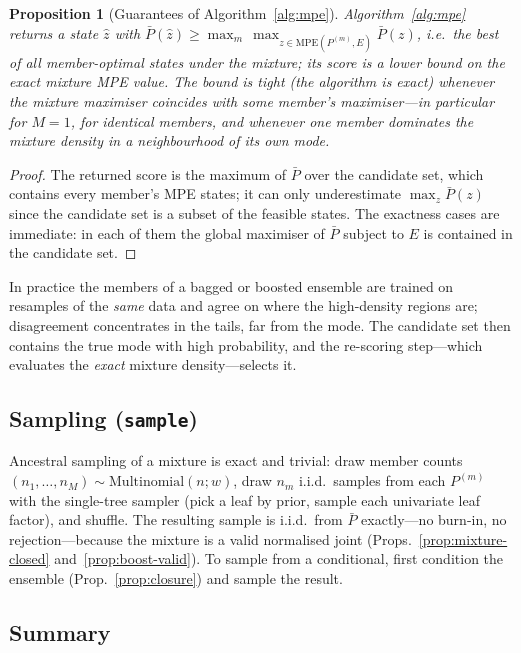 \documentclass[11pt]{article}
\theoremstyle{plain}
\newtheorem{proposition}[theorem]{Proposition}
\theoremstyle{definition}
\theoremstyle{remark}
\begin{document}
\begin{proposition}[Guarantees of Algorithm~\ref{alg:mpe}]
\label{prop:mpe}
Algorithm~\ref{alg:mpe} returns a state $\hat z$ with
$\bar P(\hat z)\ge \max_m\,\max_{z\in\text{MPE}(P^{(m)},E)}\bar P(z)$,
i.e.\ the best of all member-optimal states under the mixture; its score
is a lower bound on the exact mixture MPE value. The bound is tight
(the algorithm is exact) whenever the mixture maximiser coincides with
some member's maximiser---in particular for $M=1$, for identical
members, and whenever one member dominates the mixture density in a
neighbourhood of its own mode.
\end{proposition}
\begin{proof}
The returned score is the maximum of $\bar P$ over the candidate set,
which contains every member's MPE states; it can only underestimate
$\max_z\bar P(z)$ since the candidate set is a subset of the feasible
states. The exactness cases are immediate: in each of them the global
maximiser of $\bar P$ subject to $E$ is contained in the candidate set.
\end{proof}

In practice the members of a bagged or boosted ensemble are trained on
resamples of the \emph{same} data and agree on where the high-density
regions are; disagreement concentrates in the tails, far from the mode.
The candidate set then contains the true mode with high probability, and
the re-scoring step---which evaluates the \emph{exact} mixture
density---selects it.

\subsection{Sampling (\texttt{sample})}

Ancestral sampling of a mixture is exact and trivial: draw member counts
$(n_1,\dots,n_M)\sim\text{Multinomial}(n; w)$, draw $n_m$ i.i.d.\ samples
from each $P^{(m)}$ with the single-tree sampler (pick a leaf by prior,
sample each univariate leaf factor), and shuffle. The resulting sample is
i.i.d.\ from $\bar P$ exactly---no burn-in, no rejection---because the
mixture is a valid normalised joint (Props.~\ref{prop:mixture-closed}
and~\ref{prop:boost-valid}). To sample from a conditional, first
condition the ensemble (Prop.~\ref{prop:closure}) and sample the result.

\subsection{Summary}
\end{document}
